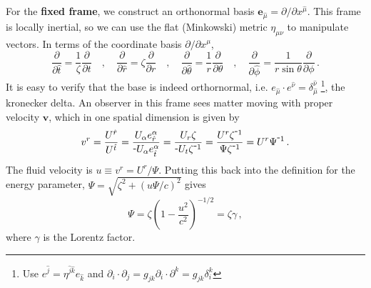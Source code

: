 \documentclass[../main.tex]{subfiles}
\begin{document}
For the \textbf{fixed frame}, we construct an orthonormal basis $\bm{e}_{\hat{\mu}}=\partial/\partial x^{\hat{\mu}}$.  This frame is locally inertial, so we can use the flat (Minkowski) metric $\eta_{\mu\nu}$ to manipulate vectors.  In terms of the coordinate basis $\partial/\partial x^{\mu}$,
\begin{equation}\label{eq::fixed_to_coord}
    \frac{\partial}{\partial \hat{t}}=\frac{1}{\zeta}\frac{\partial}{\partial t} 
    \quad,\quad
    \frac{\partial}{\partial \hat{r}}=\zeta\frac{\partial}{\partial r} \quad,\quad
    \frac{\partial}{\partial \hat{\theta}}=\frac{1}{r}\frac{\partial}{\partial \theta} \quad,\quad
    \frac{\partial}{\partial \hat{\phi}}=\frac{1}{r\sin\theta}\frac{\partial}{\partial\phi}\,.
\end{equation}
It is easy to verify that the base is indeed orthornormal, i.e. $e_{\hat{\mu}}\cdot e^{\hat{\nu}}=\delta_{\hat{\mu}}^{\hat{\nu}}\;$\footnote{Use $ e^{\hat{j}}=\eta^{\hat{j}\hat{k}}e_{\hat{k}}$ and $\partial_i\cdot\partial_j=g_{jk}\partial_i\cdot\partial^k=g_{jk}\delta^k_i$}, the kronecker delta.  An observer in this frame sees matter moving with proper velocity $\bm{v}$, which in one spatial dimension is given by
\begin{equation}
    v^r=\frac{U^{\hat{r}}}{U^{\hat{t}}}=\frac{U_\alpha e_{\hat{r}}^\alpha}{\-U_\alpha e_{\hat{t}}^\alpha}=\frac{U_r\zeta}{\-U_t\zeta^{\-1}}=\frac{U^r\zeta^{\-1}}{\Psi\zeta^{\-1}}=U^r\Psi^{\-1} \,.
\end{equation}
The fluid velocity is $u\equiv v^r=U^r/\Psi$. Putting this back into the definition for the energy parameter, $\Psi=\sqrt{\zeta^2+(u\Psi/c)^2}$ gives
\begin{equation}
    \Psi=\zeta\left(1-\frac{u^2}{c^2}\right)^{-1/2}=\zeta\gamma\,,
\end{equation}
where $\gamma$ is the Lorentz factor.
\end{document}
